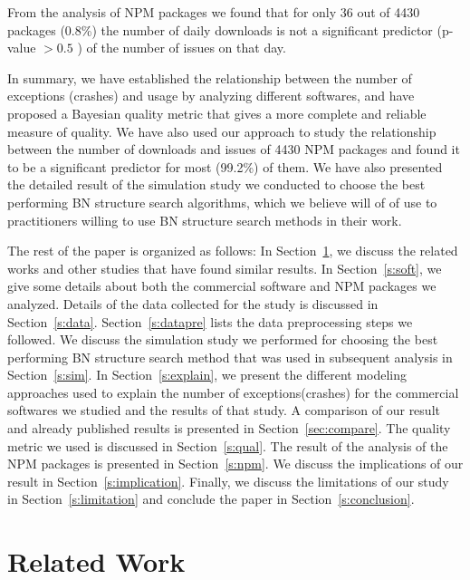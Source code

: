 \documentclass[smallextended]{svjour3}       %
\begin{document}
From the analysis of NPM packages we found that for only 36 out of 4430 packages (0.8\%) the number of daily downloads is not a significant predictor (p-value $> 0.5$ ) of the number of issues on that day.

In summary, we have established the relationship between the number of exceptions (crashes) and usage by analyzing different softwares, and have proposed a Bayesian quality metric that gives a more complete and reliable measure of quality. We have also used our approach to study the relationship between the number of downloads and issues of 4430 NPM packages and found it to be a significant predictor for most (99.2\%) of them. We have also presented the detailed result of the simulation study we conducted to choose the best performing BN structure search algorithms, which we believe will of of use to practitioners willing to use BN structure search methods in their work.

The rest of the paper is organized as follows: In Section~\ref{s:relwork}, we discuss the related works and other studies that have found similar results. In Section~\ref{s:soft}, we give some details about both the commercial software and NPM packages we analyzed. Details of the data collected for the study is discussed in Section~\ref{s:data}. Section~\ref{s:datapre} lists the data preprocessing steps we followed. We discuss the simulation study we performed for choosing the best performing BN structure search method that was used in subsequent analysis in Section~\ref{s:sim}. In Section~\ref{s:explain}, we present the different modeling approaches used to explain the number of exceptions(crashes) for the commercial softwares we studied and the results of that study. A comparison of our result and already published results is presented in Section~\ref{sec:compare}. 
The quality metric we used is discussed in Section~\ref{s:qual}. The result of the analysis of the NPM packages is presented in Section~\ref{s:npm}. We discuss the implications of our result in Section~\ref{s:implication}. Finally, we discuss the limitations of our study in Section~\ref{s:limitation} and conclude the paper in Section~\ref{s:conclusion}.  

\section{Related Work}\label{s:relwork}
\end{document}

